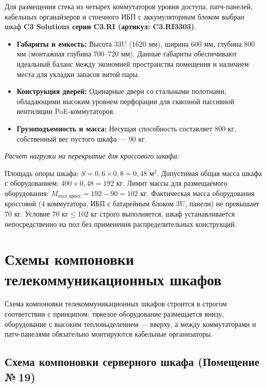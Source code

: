 \documentclass[a4paper,oneside,14pt]{extreport}
\begin{document}
Для размещения стека из четырех коммутаторов уровня доступа, патч-панелей, кабельных органайзеров и стоечного ИБП с аккумуляторным блоком выбран шкаф \textbf{C3 Solutions серии C3.RI (артикул: C3.RI3303)}.
\begin{itemize}
    \item \textbf{Габариты и емкость:} Высота 33U (1620 мм), ширина 600 мм, глубина 800 мм (монтажная глубина 700--720 мм). Данные габариты обеспечивают идеальный баланс между экономией пространства помещения и наличием места для укладки запасов витой пары.
    \item \textbf{Конструкция дверей:} Одинарные двери со стальными полотнами, обладающими высоким уровнем перфорации для сквозной пассивной вентиляции PoE-коммутаторов.
    \item \textbf{Грузоподъемность и масса:} Несущая способность составляет 800 кг, собственный вес пустого шкафа --- 90 кг.
\end{itemize}

\textit{Расчет нагрузки на перекрытие для кроссового шкафа:}

Площадь опоры шкафа: $S = 0{,}6 \times 0{,}8 = 0{,}48 \text{ м}^2$.
Допустимая общая масса шкафа с оборудованием: $400 \times 0{,}48 = 192 \text{ кг}$.
Лимит массы для размещаемого оборудования: $M_{\text{max\_кросс}} = 192 - 90 = 102 \text{ кг}$.
Фактическая масса оборудования кроссовой (4 коммутатора, ИБП с батарейным блоком 3U, панели) не превышает 70 кг. Условие $70 \text{ кг} \le 102 \text{ кг}$ строго выполняется, шкаф устанавливается непосредственно на пол без применения распределительных конструкций.

\section{Схемы компоновки телекоммуникационных шкафов}

Схема компоновки телекоммуникационных шкафов строится в строгом соответствии с принципом: тяжелое оборудование размещается внизу, оборудование с высоким тепловыделением --- вверху, а между коммутаторами и патч-панелями обязательно монтируются кабельные организаторы.

\subsection{Схема компоновки серверного шкафа (Помещение №\,19)}
\end{document}

